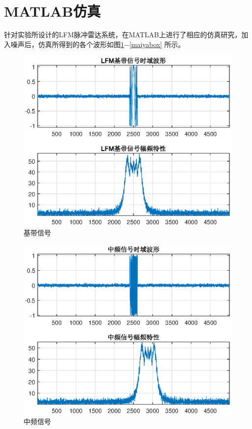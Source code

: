 \documentclass[12pt]{article}
\begin{document}
\section{MATLAB仿真}
\setcounter{table}{0}\setcounter{figure}{0}\setcounter{equation}{0}
针对实验所设计的LFM脉冲雷达系统，在MATLAB上进行了相应的仿真研究，加入噪声后，仿真所得到的各个波形如图\ref{jidaibox}$-$\ref{maiyabox}
所示。
\begin{figure}[htbp]
  \centering
  \includegraphics[width=.8\textwidth]{jidaibox}
  \caption{基带信号}\label{jidaibox}
\end{figure}
\begin{figure}[htbp]
  \centering
  \includegraphics[width=.8\textwidth]{zhongpinbox}
  \caption{中频信号}\label{zhongpinbox}
\end{figure}
\end{document}
